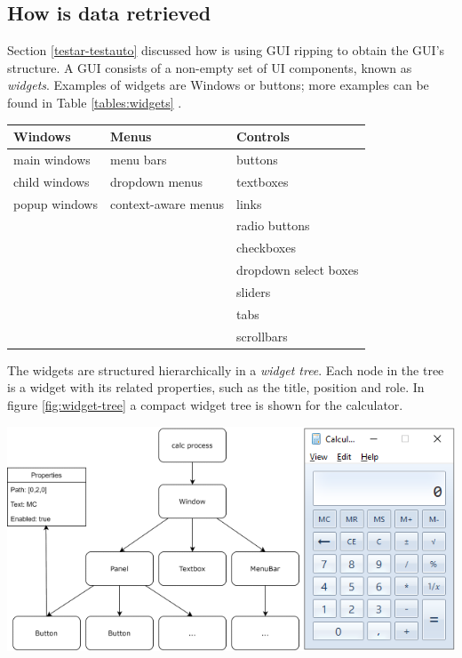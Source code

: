\subsection{How is data retrieved} \label{data-retrieval}

Section \ref{testar-testauto} discussed how \testar is using GUI ripping to obtain the GUI's structure. A GUI consists of a non-empty set of UI components, known as \emph{widgets}. Examples of widgets are Windows or buttons; more examples can be found in Table \ref{tables:widgets} \cite{VosAho2021}. 

\begingroup
\captionsetup{type=table}
\begin{tabularx}{\textwidth}{ 
  | >{\raggedright\arraybackslash}X 
  | >{\raggedright\arraybackslash}X 
  | >{\raggedright\arraybackslash}X | }
    \hline
    Windows & Menus & Controls \\
    \hline
    \hline
    main windows & menu bars & buttons \\
    child windows & dropdown menus & textboxes \\
    popup windows & context-aware menus & links \\
    && radio buttons \\
    && checkboxes\\
    && dropdown select boxes\\
    && sliders\\
    && tabs\\
    && scrollbars \\
    \hline
\end{tabularx}
\label{tables:widgets}
\endgroup

The widgets are structured hierarchically in a \emph{widget tree}. Each node in the tree is a widget with its related properties, such as the title, position and role. In figure \ref{fig:widget-tree} a compact widget tree is shown for the calculator. 

\bigskip
\begingroup
\captionsetup{type=figure}
\includegraphics[scale=0.7]{images/calc-tree.png}
\label{fig:widget-tree}
\endgroup


